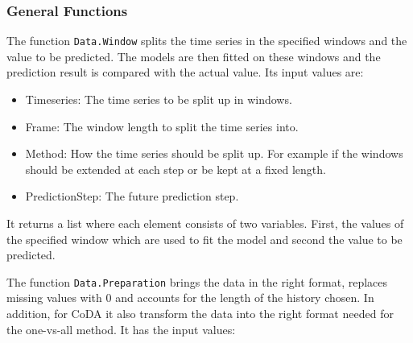 \subsubsection{General Functions}
\label{sec: General Functions}

The function \texttt{Data.Window} splits the time series in the specified windows and the value to be predicted. The models are then fitted on these windows and the prediction result is compared with the actual value. Its input values are:

\begin{itemize}
	\item Timeseries: The time series to be split up in windows.
	\item Frame: The window length to split the time series into.
	\item Method: How the time series should be split up. For example if the windows should be extended at each step or be kept at a fixed length.
	\item PredictionStep: The future prediction step.
\end{itemize}

It returns a list where each element consists of two variables. First, the values of the specified window which are used to fit the model and second the value to be predicted. 

The function \texttt{Data.Preparation} brings the data in the right format, replaces missing values with 0 and accounts for the length of the history chosen. In addition, for CoDA it also transform the data into the right format needed for the one-vs-all method. It has the input values:

